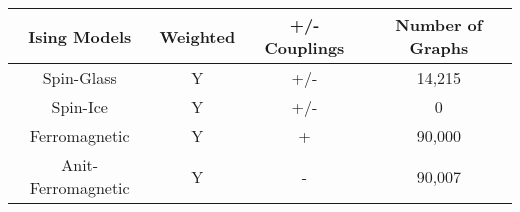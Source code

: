 \documentclass{standalone}
\begin{document}
\begin{tabular}{ |c|c|c|c| } 
    \hline
    Ising Models & Weighted & +/- Couplings & Number of Graphs\\ 
    \hline
    Spin-Glass & Y & +/- & 14,215 \\ 
    Spin-Ice & Y & +/- & 0 \\ 
    Ferromagnetic & Y & + & 90,000  \\ 
    Anit-Ferromagnetic & Y & - & 90,007  \\ 

    \hline
\end{tabular}
\end{document}
